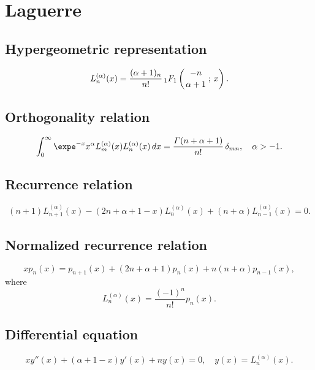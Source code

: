 \documentclass[envcountchap,graybox]{svmono}
\newcommand{\hyp}[5]{\mbox{}_{#1}{F}_{#2}
\left(\genfrac{}{}{0pt}{}{#3}{#4}\,;\,#5\right)}
\renewcommand{\Gamma}{\varGamma}
\newcommand{\hyp}[5]{\,\mbox{}_{#1}F_{#2}\!\left(
  \genfrac{}{}{0pt}{}{#3}{#4};#5\right)}
\begin{document}
\section{Laguerre}

\par\setcounter{equation}{0}

\subsection*{Hypergeometric representation}
\begin{equation}
\label{DefLaguerre}
L_n^{(\alpha)}(x)=\frac{(\alpha+1)_n}{n!}\,\hyp{1}{1}{-n}{\alpha+1}{x}.
\end{equation}

\subsection*{Orthogonality relation}
\begin{equation}
\label{OrtLaguerre}
\int_0^{\infty}\expe^{-x}x^{\alpha}L_m^{(\alpha)}(x)L_n^{(\alpha)}(x)\,dx=
\frac{\Gamma(n+\alpha+1)}{n!}\,\delta_{mn},\quad\alpha > -1.
\end{equation}

\subsection*{Recurrence relation}
\begin{equation}
\label{RecLaguerre}
(n+1)L_{n+1}^{(\alpha)}(x)-(2n+\alpha+1-x)L_n^{(\alpha)}(x)+(n+\alpha)L_{n-1}^{(\alpha)}(x)=0.
\end{equation}

\subsection*{Normalized recurrence relation}
\begin{equation}
\label{NormRecLaguerre}
xp_n(x)=p_{n+1}(x)+(2n+\alpha+1)p_n(x)+n(n+\alpha)p_{n-1}(x),
\end{equation}
where
$$L_n^{(\alpha)}(x)=\frac{(-1)^n}{n!}p_n(x).$$

\subsection*{Differential equation}
\begin{equation}
\label{dvLaguerre}
xy''(x)+(\alpha+1-x)y'(x)+ny(x)=0,\quad y(x)=L_n^{(\alpha)}(x).
\end{equation}
\end{document}

